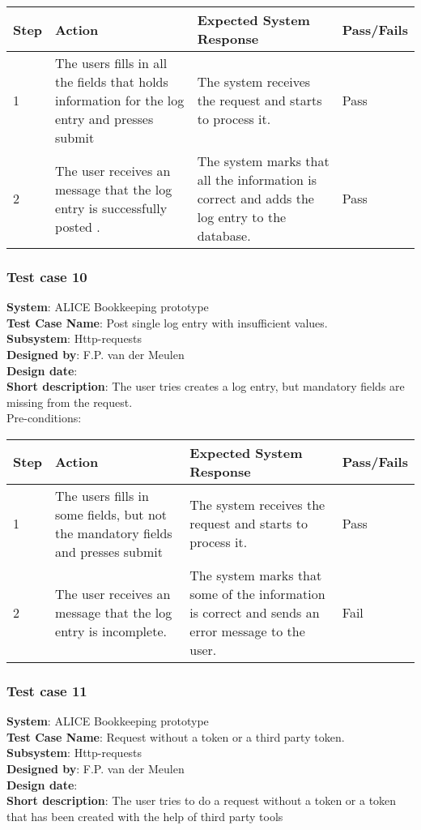 \begin{longtable}{ | p{0.8cm} | p{4.5cm} | p{6cm} | p{1.5cm} |}
\hline
Step & Action & Expected System Response & Pass/Fails  \\ \hline
1 & The users fills in all the fields that holds information for the log entry and presses submit & The system receives the request and starts to process it. & Pass \\ \hline
2 & The user receives an message that the log entry is successfully posted . & The system marks that all the information is correct and adds the log entry to the database. & Pass
\end{longtable}
\subsubsection{Test case 10}
\textbf{System}:  ALICE Bookkeeping prototype \\
\textbf{Test Case Name}:  Post single log entry with insufficient values. \\
\textbf{Subsystem}:  Http-requests \\
\textbf{Designed by}:  F.P. van der Meulen\\
\textbf{Design date}:  \\
\textbf{Short description}: The user tries creates a log entry, but mandatory fields are missing from the request. \\

Pre-conditions: \\

\begin{longtable}{ | p{0.8cm} | p{4.5cm} | p{6cm} | p{1.5cm} |}
\hline
Step & Action & Expected System Response & Pass/Fails  \\ \hline
1 & The users fills in some fields, but not the mandatory fields and presses submit & The system receives the request and starts to process it. & Pass \\ \hline
2 & The user receives an message that the log entry is incomplete. & The system marks that some of the information is correct and sends an error message to the user. & Fail
\end{longtable}

\subsubsection{Test case 11}
\textbf{System}:  ALICE Bookkeeping prototype \\
\textbf{Test Case Name}:  Request without a token or a third party token. \\
\textbf{Subsystem}:  Http-requests \\
\textbf{Designed by}:  F.P. van der Meulen\\
\textbf{Design date}:  \\
\textbf{Short description}: The user tries to do a request without a token or a token that has been created with the help of third party tools \\

